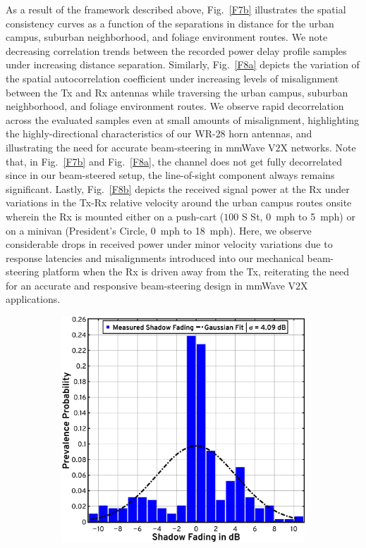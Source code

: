 \documentclass[10pt, twocolumn]{IEEEtran}
\begin{document}
{As a result of the framework described above, Fig.~\ref{F7b} illustrates the spatial consistency curves as a function of the separations in distance for the urban campus, suburban neighborhood, and foliage environment routes. We note decreasing correlation trends between the recorded power delay profile samples under increasing distance separation. Similarly, Fig.~\ref{F8a} depicts the variation of the spatial autocorrelation coefficient under increasing levels of misalignment between the Tx and Rx antennas while traversing the urban campus, suburban neighborhood, and foliage environment routes. We observe rapid decorrelation across the evaluated samples even at small amounts of misalignment, highlighting the highly-directional characteristics of our WR-$28$ horn antennas, and illustrating the need for accurate beam-steering in mmWave V$2$X networks. Note that, in Fig.~\ref{F7b} and Fig.~\ref{F8a}, the channel does not get fully decorrelated since in our beam-steered setup, the line-of-sight component always remains significant. Lastly, Fig.~\ref{F8b} depicts the received signal power at the Rx under variations in the Tx-Rx relative velocity around the urban campus routes onsite wherein the Rx is mounted either on a push-cart ($100$ S St, \SI{0}{mph} to \SI{5}{mph}) or on a minivan (President's Circle, \SI{0}{mph} to \SI{18}{mph}). Here, we observe considerable drops in received power under minor velocity variations due to response latencies and misalignments introduced into our mechanical beam-steering platform when the Rx is driven away from the Tx, reiterating the need for an accurate and responsive beam-steering design in mmWave V$2$X applications.
\begin{figure} [t]
    \centering
    \begin{subfigure}{0.4965\linewidth}
        \centering
        \includegraphics[width=1.0\linewidth]{figs/urban_campus_shadow_fading_1.pdf}

\end{subfigure}
\end{figure}}
\end{document}
